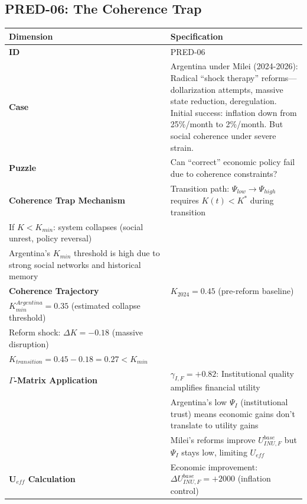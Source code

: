 
\subsection{PRED-06: The Coherence Trap}
\label{subsec:pred-06-calc}

\begin{table}[htbp]
\small
\begin{tabular}{p{3cm}p{11cm}}
\toprule
\textbf{Dimension} & \textbf{Specification} \\
\midrule
\textbf{ID} & PRED-06 \\
\textbf{Case} & Argentina under Milei (2024-2026): Radical ``shock therapy'' reforms---dollarization attempts, massive state reduction, deregulation. Initial success: inflation down from 25\%/month to 2\%/month. But social coherence under severe strain. \\
\textbf{Puzzle} & Can ``correct'' economic policy fail due to coherence constraints? \\
\textbf{Coherence Trap Mechanism} &
Transition path: $\Psi_{low} \to \Psi_{high}$ requires $K(t) < K^*$ during transition \\
If $K < K_{min}$: system collapses (social unrest, policy reversal) \\
Argentina's $K_{min}$ threshold is high due to strong social networks and historical memory \\
\textbf{Coherence Trajectory} &
$K_{2024} = 0.45$ (pre-reform baseline) \\
$K_{min}^{Argentina} = 0.35$ (estimated collapse threshold) \\
Reform shock: $\Delta K = -0.18$ (massive disruption) \\
$K_{transition} = 0.45 - 0.18 = 0.27 < K_{min}$ \\
\textbf{$\Gamma$-Matrix Application} &
$\gamma_{I,F} = +0.82$: Institutional quality amplifies financial utility \\
& Argentina's low $\Psi_I$ (institutional trust) means economic gains don't translate to utility gains \\
& Milei's reforms improve $U_{INU,F}^{base}$ but $\Psi_I$ stays low, limiting $U_{eff}$ \\
\textbf{U$_{eff}$ Calculation} &
Economic improvement: $\Delta U_{INU,F}^{base} = +2000$ (inflation control) \\

\end{tabular}
\end{table}
